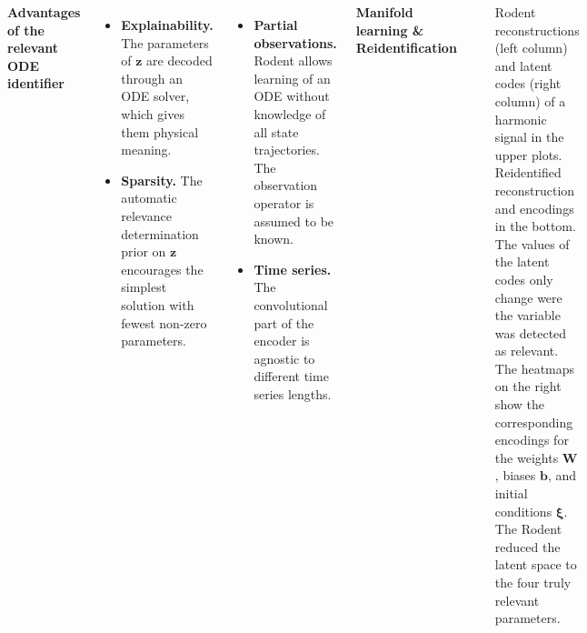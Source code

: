 \documentclass[25pt]{tikzposter}
\begin{document}
\begin{columns}
{    \vspace{1cm}
    \begin{center}
      {\huge\bf Advantages of the relevant ODE identifier}\\
    \end{center}

    \vspace{1cm}
    \begin{minipage}[t]{.28\textwidth}
    \begin{itemize}
      \item \textbf{Explainability.}  The parameters of $\bm z$ are
        decoded through an ODE solver, which gives them physical meaning.
      \item \textbf{Sparsity.} The automatic relevance determination prior on
        $\bm{z}$ encourages the simplest solution with fewest non-zero parameters.
    \end{itemize}
    \end{minipage}
    \hspace{.01\textwidth}
    \begin{minipage}[t]{.28\textwidth}
    \begin{itemize}
      \item \textbf{Partial observations.} Rodent allows learning of an ODE
        without knowledge of all state trajectories. The
        observation operator is assumed to be known.
      \item \textbf{Time series.} The convolutional part of the encoder is
        agnostic to different time series lengths.
    \end{itemize}
    \end{minipage}


    \vspace{1cm}
    \begin{center}
      {\huge\bf Manifold learning \& Reidentification}\\
    \end{center}
    \begin{tikzfigure}
      \includegraphics[width=.50\textwidth]{single_enc_rec.pdf}
    \end{tikzfigure}
    Rodent reconstructions (left column) and latent codes (right column) of a
    harmonic signal in the upper plots. Reidentified reconstruction and
    encodings in the bottom.  The values of the latent codes only change were
    the variable was detected as relevant.  The heatmaps on the right show
    the corresponding encodings for the weights $\bm W$, biases $\bm b$, and
    initial conditions $\bm\xi$. The Rodent reduced
    the latent space to the four truly relevant parameters.

}
\end{columns}
\end{document}
